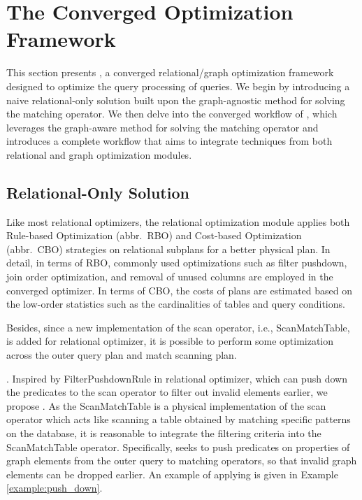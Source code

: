 \section{The Converged Optimization Framework}
\label{sec:optimizations}

This section presents \name, a converged relational/graph optimization framework designed to optimize the query
processing of \spjm queries. We begin by introducing a naive relational-only solution built upon the graph-agnostic
method for solving the matching operator. We then delve into the converged workflow of \name, which leverages the graph-aware method for solving the matching operator and introduces a complete workflow that aims to integrate techniques from both relational and graph optimization modules.

\subsection{Relational-Only Solution}

Like most relational optimizers, the relational optimization module applies both Rule-based Optimization (abbr.~RBO) and Cost-based Optimization (abbr.~CBO) strategies on relational subplans for a better physical plan.
In detail, in terms of RBO, commonly used optimizations such as filter pushdown, join order optimization, and removal of unused columns are employed in the converged optimizer.
In terms of CBO, the costs of plans are estimated based on the low-order statistics such as the cardinalities of tables and query conditions.

Besides, since a new implementation of the scan operator, i.e., ScanMatchTable, is added for relational optimizer, it is possible to perform some optimization across the outer query plan and match scanning plan.

\filterrule.
Inspired by FilterPushdownRule in relational optimizer, which can push down the predicates to the scan operator to filter out invalid elements earlier, we propose \filterrule.
As the ScanMatchTable is a physical implementation of the scan operator which acts like scanning a table obtained by matching specific patterns on the database, it is reasonable to integrate the filtering criteria into the ScanMatchTable operator.
Specifically, \filterrule seeks to push predicates on properties of graph elements from the outer query to matching operators, so that invalid graph elements can be dropped earlier.
An example of applying \filterrule is given in Example \ref{example:push_down}.

